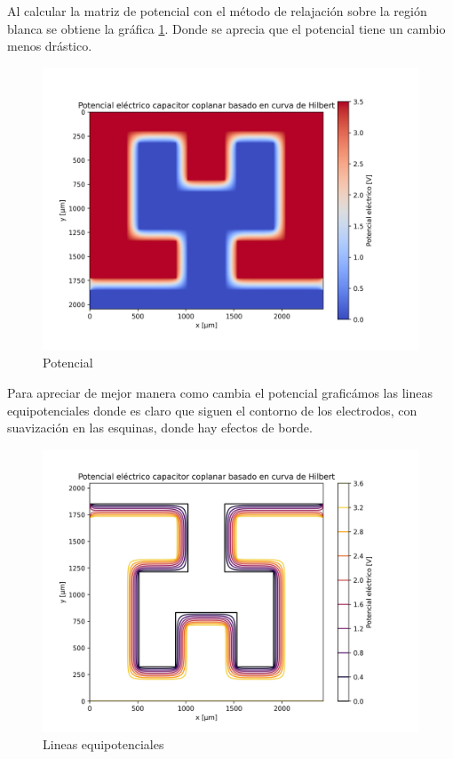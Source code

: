 Al calcular la matriz de potencial con el método de relajación sobre la región blanca se obtiene la gráfica \ref{fig:potencial}. Donde se aprecia que el potencial tiene un cambio menos drástico.

\begin{figure}[H]
\centering
\includegraphics[width=1.1\columnwidth]{img/pothilheat.jpg}
    \caption{Potencial  }
    \label{fig:potencial}
\end{figure}

Para apreciar de mejor manera como cambia el potencial graficámos las lineas equipotenciales donde es claro que siguen el contorno de los electrodos, con suavización en las esquinas, donde hay efectos de borde.  

\begin{figure}[H]
\centering
    \includegraphics[width=1.2\columnwidth]{img/pothileq.jpg}
    \caption{Lineas equipotenciales  }
    \label{fig:equipV}
\end{figure}

